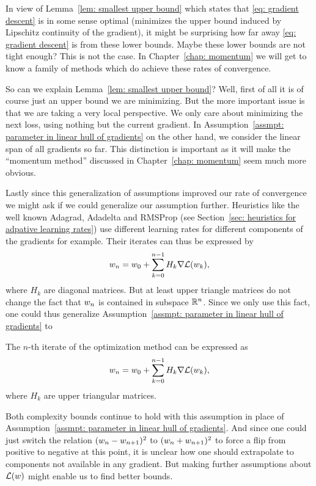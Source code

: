 In view of Lemma~\ref{lem: smallest upper bound} which states that \ref{eq:
gradient descent} is in some sense optimal (minimizes the upper bound induced by
Lipschitz continuity of the gradient), it might be surprising how far away
\ref{eq: gradient descent} is from these lower bounds. Maybe these lower bounds are not
tight enough? This is not the case. In Chapter~\ref{chap: momentum} we will get
to know a family of methods which do achieve these rates of convergence.

So can we explain Lemma~\ref{lem: smallest upper bound}? Well, first of all it
is of course just an upper bound we are minimizing. But the more important issue
is that we are taking a very local perspective. We only care about minimizing
the next loss, using nothing but the current gradient. In
Assumption~\ref{assmpt: parameter in linear hull of gradients} on the other
hand, we consider the linear span of all gradients so far. This distinction is
important as it will make the ``momentum method'' discussed in
Chapter~\ref{chap: momentum} seem much more obvious.

Lastly since this generalization of assumptions improved our rate of convergence
we might ask if we could generalize our assumption further. Heuristics like
the well known Adagrad, Adadelta and RMSProp (see Section~\ref{sec: heuristics
for adpative learning rates}) use different learning rates for different
components of the gradients for example. Their iterates can thus
be expressed by
%
\begin{align*}
	w_n = w_0 + \sum_{k=0}^{n-1} H_k \nabla\mathcal{L}(w_k),
\end{align*}
%
where \(H_k\) are diagonal matrices. But at least upper triangle matrices do
not change the fact that \(w_n\) is contained in subspace \(\mathbb{R}^n\).
Since we only use this fact, one could thus generalize Assumption~\ref{assmpt:
parameter in linear hull of gradients} to
%
\begin{assumption}
	\label{assmpt: parameter in generalized linear hull of gradients}
	The \(n\)-th iterate of the optimization method can be expressed as
	\begin{align*}
		w_n = w_0 + \sum_{k=0}^{n-1} H_k \nabla\mathcal{L}(w_k),
	\end{align*}
	where \(H_k\) are upper triangular matrices.
\end{assumption}

Both complexity bounds continue to hold with this assumption in place of
Assumption~\ref{assmpt: parameter in linear hull of gradients}. And since one
could just switch the relation \((w_n-w_{n+1})^2\) to
\((w_n+w_{n+1})^2\) to force a flip from positive to negative
at this point, it is unclear how one should extrapolate to components not
available in any gradient. But making further assumptions about
\(\mathcal{L}(w)\) might enable us to find better bounds.



\endinput